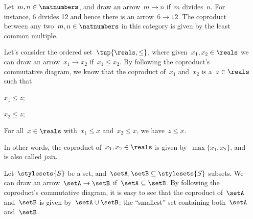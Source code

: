 \begin{example}
    Let~$m,n\in \natnumbers$, and draw an arrow~$m\to n$ if~$m$ divides~$n$. For instance, 6 divides 12 and hence there is an arrow~$6\to 12$. The coproduct between any two~$m,n\in \natnumbers$ in this category is given by the least common multiple.
\end{example}

\begin{example}
    Let's consider the ordered set~$\tup{\reals,\leq}$, where given~$x_1,x_2\in \reals$ we can draw an arrow~$x_1\to x_2$ if~$x_1\leq x_2$. By following the coproduct's commutative diagram, we know that the coproduct of~$x_1$ and~$x_2$ is a~$z\in \reals$ such that
    \begin{compactitem}
        \item $x_1\leq z$;
        \item $x_2\leq z$;
        \item For all~$x\in \reals$ with~$x_1\leq x$ and~$x_2\leq x$, we have~$z\leq x$.
    \end{compactitem}
    In other words, the coproduct of~$x_1,x_2\in \reals$ is given by~$\max\{x_1,x_2\}$, and is also called \emph{join}.
\end{example}

\begin{example}
    \label{ex:subset_coprod}
    Let~$\stylesets{S}$ be a set, and~$\setA,\setB\subseteq \stylesets{S}$ subsets.
    We can draw an arrow~$\setA\to \setB$ if~$\setA\subseteq \setB$.
    By following the coproduct's commutative diagram, it is easy to see that the coproduct of~$\setA$ and~$\setB$ is given by~$\setA\cup\setB$: the ``smallest'' set containing both~$\setA$ and~$\setB$.
\end{example}


